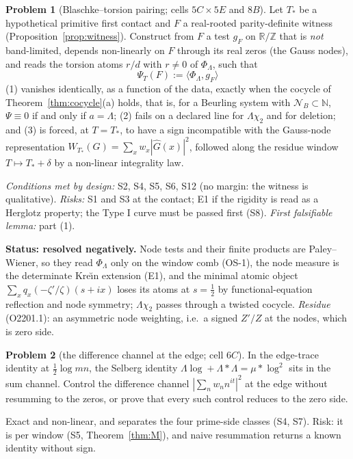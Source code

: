\documentclass[11pt]{amsart}
\theoremstyle{definition}
\newtheorem{problem}{Problem}
\theoremstyle{remark}
\newcommand{\R}{\mathbb R}
\newcommand{\N}{\mathbb N}
\newcommand{\Z}{\mathbb Z}
\begin{document}
\begin{problem}[Blaschke--torsion pairing; cells $5C\times5E$ and $8B$]\label{prob:1}
Let $T_*$ be a hypothetical primitive first contact and $F$ a real-rooted parity-definite witness
(Proposition~\ref{prop:witness}). Construct from $F$ a test $g_F$ on $\R/\Z$ that is \emph{not} band-limited,
depends non-linearly on $F$ through its real zeros (the Gauss nodes), and reads the torsion atoms $r/d$ with
$r\ne0$ of $\Phi_\Lambda$, such that
\[
\Psi_T(F):=\langle\Phi_\Lambda,g_F\rangle
\]
(1) vanishes identically, as a function of the data, exactly when the cocycle of Theorem~\ref{thm:cocycle}(a)
holds, that is, for a Beurling system with $\mathcal N_B\subset\N$, $\Psi\equiv0$ if and only if $a=\Lambda$;
(2) fails on a declared line for $\Lambda\chi_2$ and for deletion; and (3) is forced, at $T=T_*$, to have a sign
incompatible with the Gauss-node representation $W_{T_*}(G)=\sum_xw_x|\widehat G(x)|^2$, followed along the
residue window $T\mapsto T_*+\delta$ by a non-linear integrality law.
\end{problem}
\noindent \emph{Conditions met by design:} S2, S4, S5, S6, S12 (no margin: the witness is qualitative).
\emph{Risks:} S1 and S3 at the contact; E1 if the rigidity is read as a Herglotz property; the Type I curve
must be passed first (S8). \emph{First falsifiable lemma:} part (1).

\noindent\textbf{Status: resolved negatively.} Node tests and their finite products are Paley--Wiener, so they
read $\Phi_\Lambda$ only on the window comb (OS-1), the node measure is the determinate Kre\u{\i}n extension
(E1), and the minimal atomic object $\sum_xq_x(-\zeta'/\zeta)(s+ix)$ loses its atoms at $s=\frac12$ by
functional-equation reflection and node symmetry; $\Lambda\chi_2$ passes through a twisted cocycle.
\emph{Residue} (O2201.1): an asymmetric node weighting, i.e.\ a signed $Z'/Z$ at the nodes, which is zero side.

\begin{problem}[the difference channel at the edge; cell $6C$]\label{prob:2}
In the edge-trace identity at $\frac12\log mn$, the Selberg identity $\Lambda\log+\Lambda*\Lambda=\mu*\log^2$ sits in
the sum channel. Control the difference channel $|\sum_nw_nn^{it}|^2$ at the edge without resumming to the
zeros, or prove that every such control reduces to the zero side.
\end{problem}
\noindent Exact and non-linear, and separates the four prime-side classes (S4, S7). Risk: it is per window (S5,
Theorem~\ref{thm:M}), and naive resummation returns a known identity without sign.
\end{document}
